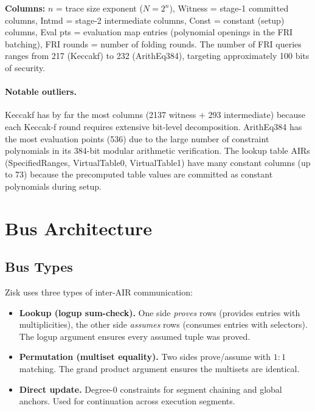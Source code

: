 \noindent
\textbf{Columns:}
$n$ = trace size exponent ($N = 2^n$),
Witness = stage-1 committed columns,
Intmd = stage-2 intermediate columns,
Const = constant (setup) columns,
Eval pts = evaluation map entries (polynomial openings in the FRI batching),
FRI rounds = number of folding rounds.
The number of FRI queries ranges from 217 (Keccakf) to 232 (ArithEq384),
targeting approximately 100 bits of security.

\paragraph{Notable outliers.}
Keccakf has by far the most columns (2137 witness $+$ 293 intermediate)
because each Keccak-f round requires extensive bit-level decomposition.
ArithEq384 has the most evaluation points (536) due to the large number
of constraint polynomials in its 384-bit modular arithmetic verification.
The lookup table AIRs (SpecifiedRanges, VirtualTable0, VirtualTable1)
have many constant columns (up to 73) because the precomputed table values
are committed as constant polynomials during setup.

\section{Bus Architecture}
\label{sec:buses}

\subsection{Bus Types}
\label{sec:bus-types}

Zisk uses three types of inter-AIR communication:

\begin{itemize}[nosep]
  \item \textbf{Lookup (logup sum-check).}
        One side \emph{proves} rows (provides entries with multiplicities),
        the other side \emph{assumes} rows (consumes entries with selectors).
        The logup argument ensures every assumed tuple was proved.

  \item \textbf{Permutation (multiset equality).}
        Two sides prove/assume with $1{:}1$ matching.
        The grand product argument ensures the multisets are identical.

  \item \textbf{Direct update.}
        Degree-0 constraints for segment chaining and global anchors.
        Used for continuation across execution segments.
\end{itemize}

